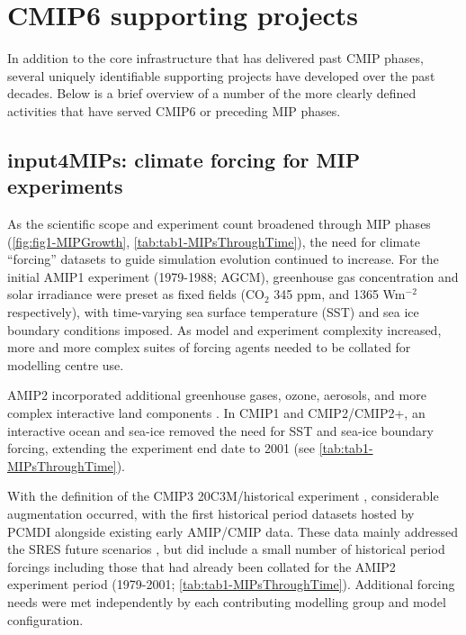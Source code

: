 \documentclass[manuscript]{copernicus}
\begin{document}
\section{CMIP6 supporting projects}
\label{sec:CMIP6SupportingProjects}
In addition to the core infrastructure that has delivered past CMIP phases, several uniquely identifiable supporting projects have developed over the past decades. Below is a brief overview of a number of the more clearly defined activities that have served CMIP6 or preceding MIP phases.


\subsection{input4MIPs: climate forcing for MIP experiments}
\label{sec:CMIP6SupportingProjects-input4MIPs}

As the scientific scope and experiment count broadened through MIP phases (\autoref{fig:fig1-MIPGrowth}, \autoref{tab:tab1-MIPsThroughTime}), the need for climate ``forcing'' datasets to guide simulation evolution continued to increase. For the initial AMIP1 experiment (1979-1988; AGCM), greenhouse gas concentration and solar irradiance were preset as fixed fields (CO$_{2}$ 345 ppm, and 1365 Wm$^{-2}$ respectively), with time-varying sea surface temperature (SST) and sea ice boundary conditions imposed. As model and experiment complexity increased, more and more complex suites of forcing agents needed to be collated for modelling centre use.

AMIP2 incorporated additional greenhouse gases, ozone, aerosols, and more complex interactive land components \citep[e.g.,][]{gleckler_amip_1996-1,liang_pcmdi_1997}. In CMIP1 and CMIP2/CMIP2+, an interactive ocean and sea-ice removed the need for SST and sea-ice boundary forcing, extending the experiment end date to 2001 (see \autoref{tab:tab1-MIPsThroughTime}).

With the definition of the CMIP3 20C3M/historical experiment \citep[$\sim$1850-2000;][]{meehl_wcrp_2007}, considerable augmentation occurred, with the first historical period datasets hosted by PCMDI alongside existing early AMIP/CMIP data. These data mainly addressed the SRES future scenarios \citep[2001-2100/2200/2300;][]{nakicenovic_summary_2000}, but did include a small number of historical period forcings including those that had already been collated for the AMIP2 experiment period (1979-2001; \autoref{tab:tab1-MIPsThroughTime}). Additional forcing needs were met independently by each contributing modelling group and model configuration.
\end{document}
